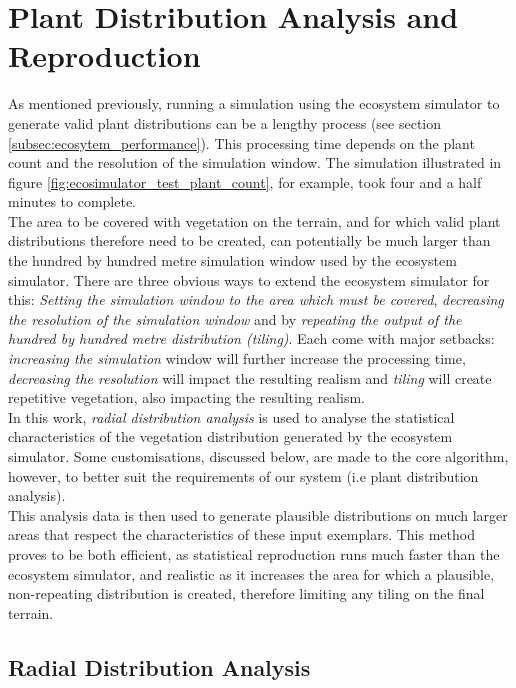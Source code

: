 \section{Plant Distribution Analysis and Reproduction} \label{sec:dist_analysis_and_rep}

As mentioned previously, running a simulation using the ecosystem simulator to generate valid plant distributions can be a lengthy process (see section \ref{subsec:ecosytem_performance}). This processing time depends on the plant count and the resolution of the simulation window. The simulation illustrated in figure \ref{fig:ecosimulator_test_plant_count}, for example, took four and a half minutes to complete.\\

The area to be covered with vegetation on the terrain, and for which valid plant distributions therefore need to be created, can potentially be much larger than the hundred by hundred metre simulation window used by the ecosystem simulator. There are three obvious ways to extend the ecosystem simulator for this: \textit{Setting the simulation window to the area which must be covered}, \textit{decreasing the resolution of the simulation window} and by \textit{repeating the output of the hundred by hundred metre distribution (tiling)}. Each come with major setbacks: \textit{increasing the simulation} window will further increase the processing time, \textit{decreasing the resolution} will impact the resulting realism and \textit{tiling} will create repetitive vegetation, also impacting the resulting realism.\\

In this work, \textit{radial distribution analysis} is used \cite{Emilien} to analyse the statistical characteristics of the vegetation distribution generated by the ecosystem simulator. Some customisations, discussed below, are made to the core algorithm, however, to better suit the requirements of our system (i.e plant distribution analysis).\\
This analysis data is then used to generate plausible distributions on much larger areas that respect the characteristics of these input exemplars. This method proves to be both efficient, as statistical reproduction runs much faster than the ecosystem simulator, and realistic as it increases the area for which a plausible, non-repeating distribution is created, therefore limiting any tiling on the final terrain.\\

\subsection{Radial Distribution Analysis} \label{subsec:radial_dist_analysis}

